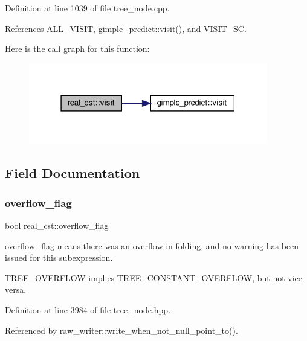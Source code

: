 Definition at line 1039 of file tree\+\_\+node.\+cpp.



References A\+L\+L\+\_\+\+V\+I\+S\+IT, gimple\+\_\+predict\+::visit(), and V\+I\+S\+I\+T\+\_\+\+SC.

Here is the call graph for this function\+:
\nopagebreak
\begin{figure}[H]
\begin{center}
\leavevmode
\includegraphics[width=295pt]{d9/d36/structreal__cst_ae6808fef9486f7f044fde5befedf425a_cgraph}
\end{center}
\end{figure}


\subsection{Field Documentation}
\mbox{\label{structreal__cst_a10a2893a80eb0e02d8c7c21195d27971}} 
\subsubsection{\texorpdfstring{overflow\+\_\+flag}{overflow\_flag}}
{\footnotesize\ttfamily bool real\+\_\+cst\+::overflow\+\_\+flag}



overflow\+\_\+flag means there was an overflow in folding, and no warning has been issued for this subexpression. 

T\+R\+E\+E\+\_\+\+O\+V\+E\+R\+F\+L\+OW implies T\+R\+E\+E\+\_\+\+C\+O\+N\+S\+T\+A\+N\+T\+\_\+\+O\+V\+E\+R\+F\+L\+OW, but not vice versa. 

Definition at line 3984 of file tree\+\_\+node.\+hpp.



Referenced by raw\+\_\+writer\+::write\+\_\+when\+\_\+not\+\_\+null\+\_\+point\+\_\+to().

\mbox{\label{structreal__cst_a1d475cc5d74e81b5e7ea489f6b79b29d}} 
